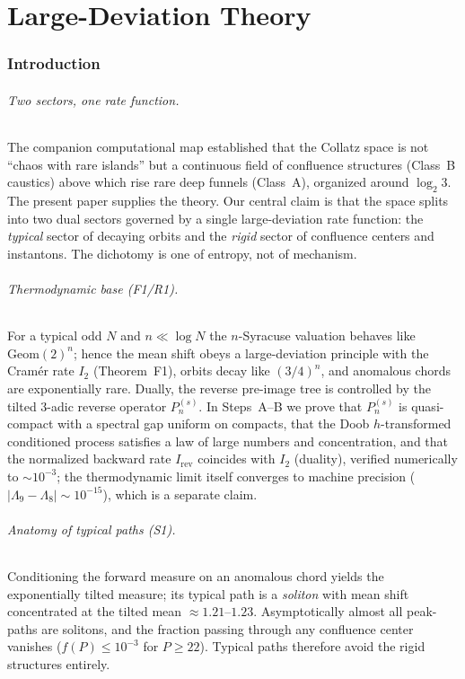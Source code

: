 \documentclass[12pt,a4paper]{article}
\theoremstyle{remark}
\begin{document}
\part{Large-Deviation Theory}

\section{Introduction}
\paragraph{Two sectors, one rate function.}
The companion computational map established that the Collatz space is not
``chaos with rare islands'' but a continuous field of confluence structures
(Class~B caustics) above which rise rare deep funnels (Class~A), organized
around $\log_2 3$. The present paper supplies the theory. Our central claim is
that the space splits into two dual sectors governed by a single
large-deviation rate function: the \emph{typical} sector of decaying orbits and
the \emph{rigid} sector of confluence centers and instantons. The dichotomy is
one of entropy, not of mechanism.

\paragraph{Thermodynamic base (F1/R1).}
For a typical odd $N$ and $n\ll\log N$ the $n$-Syracuse valuation behaves like
$\mathrm{Geom}(2)^n$; hence the mean shift obeys a large-deviation principle
with the Cram\'er rate $I_2$ (Theorem~F1), orbits decay like $(3/4)^n$, and
anomalous chords are exponentially rare. Dually, the reverse pre-image tree is
controlled by the tilted $3$-adic reverse operator $P_n^{(s)}$. In
Steps~A--B we prove that $P_n^{(s)}$ is quasi-compact with a spectral gap
uniform on compacts, that the Doob $h$-transformed conditioned process satisfies
a law of large numbers and concentration, and that the normalized backward rate
$I_{\mathrm{rev}}$ coincides with $I_2$ (duality), verified numerically to
$\sim 10^{-3}$; the thermodynamic limit itself converges to machine precision
($|\Lambda_9-\Lambda_8|\sim 10^{-15}$), which is a separate claim.

\paragraph{Anatomy of typical paths (S1).}
Conditioning the forward measure on an anomalous chord yields the exponentially
tilted measure; its typical path is a \emph{soliton} with mean shift
concentrated at the tilted mean $\approx1.21$--$1.23$. Asymptotically almost
all peak-paths are solitons, and the fraction passing through any confluence
center vanishes ($f(P)\le10^{-3}$ for $P\ge22$). Typical paths therefore avoid
the rigid structures entirely.
\end{document}
